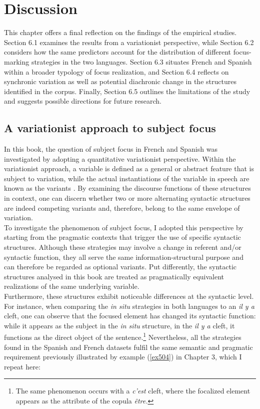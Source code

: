 
\chapter{Discussion}\label{sec:6}

This chapter offers a final reflection on the findings of the empirical studies. Section 6.1 examines the results from a variationist perspective, while Section 6.2 considers how the same predictors account for the distribution of different focus-marking strategies in the two languages. Section 6.3 situates French and Spanish within a broader typology of focus realization, and Section 6.4 reflects on synchronic variation as well as potential diachronic change in the structures identified in the corpus. Finally, Section 6.5 outlines the limitations of the study and suggests possible directions for future research.

\section{A variationist approach to subject focus}

In this book, the question of subject focus in French and Spanish was investigated by adopting a quantitative variationist perspective. Within the variationist approach, a variable is defined as a general or abstract feature that is subject to variation, while the actual instantiations of the variable in speech are known as the variants \parencite{meyerhoff2018introducing}. By examining the discourse functions of these structures in context, one can discern whether two or more alternating syntactic structures are indeed competing variants and, therefore, belong to the same envelope of variation. 
\\
To investigate the phenomenon of subject focus, I adopted this perspective by starting from the pragmatic contexts that trigger the use of specific syntactic structures. Although these strategies may involve a change in referent and/or syntactic function, they all serve the same information-structural purpose and can therefore be regarded as optional variants. Put differently, the syntactic structures analysed in this book are treated as pragmatically equivalent realizations of the same underlying variable.\\
Furthermore, these structures exhibit noticeable differences at the syntactic level. For instance, when comparing the \textit{in situ} strategies in both languages to an \textit{il y a} cleft, one can observe that the focused element has changed its syntactic function: while it appears as the subject in the \textit{in situ} structure, in the \textit{il y a} cleft, it functions as the direct object of the sentence.\footnote{The same phenomenon occurs with a \textit{c'est} cleft, where the focalized element appears as the attribute of the copula \textit{être.}} Nevertheless, all the strategies found in the Spanish and French datasets fulfil the same semantic and pragmatic requirement previously illustrated by example (\ref{ex504}) in Chapter 3, which I repeat here: 


